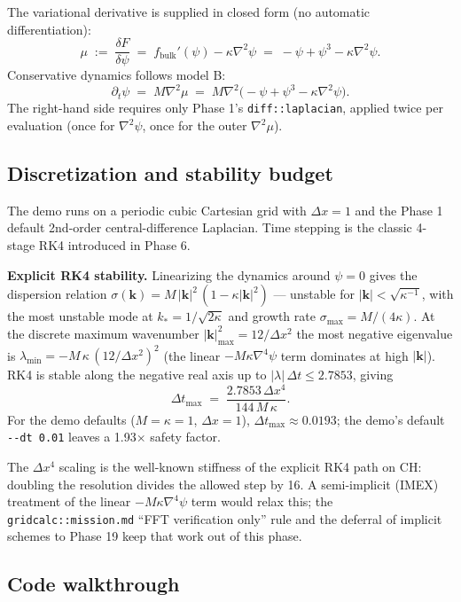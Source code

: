 The variational derivative is supplied in closed form (no automatic
differentiation):
\[
\mu \;:=\; \frac{\delta F}{\delta \psi} \;=\; f_{\text{bulk}}'(\psi) - \kappa\nabla^2\psi
\;=\; -\psi + \psi^3 - \kappa\nabla^2\psi.
\]
Conservative dynamics follows model B:
\[
\partial_t\psi \;=\; M\nabla^2\mu \;=\; M\nabla^2\big(-\psi + \psi^3 - \kappa\nabla^2\psi\big).
\]
The right-hand side requires only Phase 1's
\passthrough{\lstinline!diff::laplacian!}, applied twice per
evaluation (once for \(\nabla^2\psi\), once for the outer
\(\nabla^2\mu\)).

\subsection{Discretization and stability
budget}\label{phase12-stability}

The demo runs on a periodic cubic Cartesian grid with
\(\Delta x = 1\) and the Phase 1 default 2nd-order central-difference
Laplacian. Time stepping is the classic 4-stage RK4 introduced in
Phase 6.

\textbf{Explicit RK4 stability.} Linearizing the dynamics around
\(\psi=0\) gives the dispersion relation
\(\sigma(\mathbf k)=M\,|\mathbf k|^2\,(1-\kappa|\mathbf k|^2)\) ---
unstable for \(|\mathbf k|<\sqrt{\kappa^{-1}}\), with the most
unstable mode at \(k_*=1/\sqrt{2\kappa}\) and growth rate
\(\sigma_{\max}=M/(4\kappa)\). At the discrete maximum wavenumber
\(|\mathbf k|^2_{\max}=12/\Delta x^2\) the most negative eigenvalue is
\(\lambda_{\min} = -M\,\kappa\,(12/\Delta x^2)^2\) (the linear
\(-M\kappa\nabla^4\psi\) term dominates at high \(|\mathbf k|\)). RK4
is stable along the negative real axis up to
\(|\lambda|\,\Delta t \le 2.7853\), giving
\[
\Delta t_{\max} \;=\; \frac{2.7853\,\Delta x^4}{144\,M\,\kappa}.
\]
For the demo defaults (\(M=\kappa=1\), \(\Delta x=1\)),
\(\Delta t_{\max}\approx 0.0193\); the demo's default
\passthrough{\lstinline!--dt 0.01!} leaves a 1.93\(\times\) safety
factor.

The \(\Delta x^4\) scaling is the well-known stiffness of the explicit
RK4 path on CH: doubling the resolution divides the allowed step by
16. A semi-implicit (IMEX) treatment of the linear
\(-M\kappa\nabla^4\psi\) term would relax this; the
\passthrough{\lstinline!gridcalc::mission.md!} ``FFT verification only''
rule and the deferral of implicit schemes to Phase 19 keep that work
out of this phase.

\subsection{Code walkthrough}\label{phase12-walkthrough}

